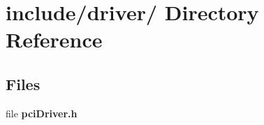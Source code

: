 \hypertarget{dir_000001}{
\section{include/driver/ Directory Reference}
\label{dir_000001}
}
\subsection*{Files}
\begin{CompactItemize}
\item 
file {\bf pci\-Driver.h}
\end{CompactItemize}

